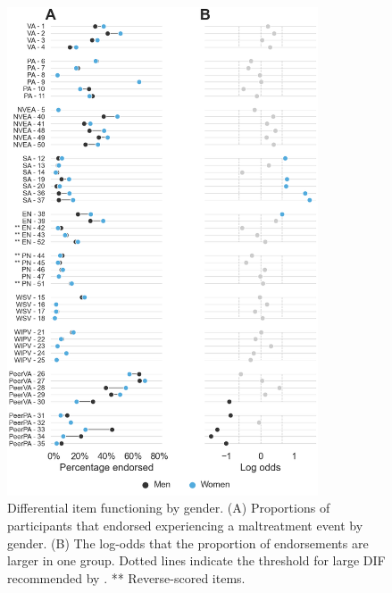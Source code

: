 \documentclass[letterpaper,man,natbib,longtable,floatsintext,12pt]{apa6}
\begin{document}
\begin{figure}[H]
    \centering
    \includegraphics[width=0.82\textwidth,center]{figures/figS02.png}
    \caption{\normalfont Differential item functioning by gender. (A) Proportions of participants that endorsed experiencing a maltreatment event by gender. (B) The log-odds that the proportion of endorsements are larger in one group. Dotted lines indicate the threshold for large DIF recommended by \cite{hidalgo2014binary}. ** Reverse-scored items.}
    \label{fig:dif_gender}
\end{figure}

\pagebreak
\end{document}
